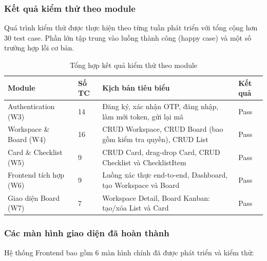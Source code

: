 \subsubsection{Kết quả kiểm thử theo module}

Quá trình kiểm thử được thực hiện theo từng tuần phát triển với tổng cộng hơn 30 test case. Phần lớn tập trung vào luồng thành công (happy case) và một số trường hợp lỗi cơ bản.

\begin{table}[H]
\centering
\begin{tabular}{|p{3.5cm}|p{1.5cm}|p{7cm}|p{1.5cm}|}
\hline
\textbf{Module} & \textbf{Số TC} & \textbf{Kịch bản tiêu biểu} & \textbf{Kết quả} \\
\hline
Authentication (W3) & 14 & Đăng ký, xác nhận OTP, đăng nhập, làm mới token, gửi lại mã & Pass \\
\hline
Workspace \& Board (W4) & 16 & CRUD Workspace, CRUD Board (bao gồm kiểm tra quyền), CRUD List & Pass \\
\hline
Card \& Checklist (W5) & 9 & CRUD Card, drag-drop Card, CRUD Checklist và ChecklistItem & Pass \\
\hline
Frontend tích hợp (W6) & 9 & Luồng xác thực end-to-end, Dashboard, tạo Workspace và Board & Pass \\
\hline
Giao diện Board (W7) & 7 & Workspace Detail, Board Kanban: tạo/xóa List và Card & Pass \\
\hline
\end{tabular}
\caption{Tổng hợp kết quả kiểm thử theo module}
\label{tab:test_summary}
\end{table}

\subsubsection{Các màn hình giao diện đã hoàn thành}

Hệ thống Frontend bao gồm 6 màn hình chính đã được phát triển và kiểm thử:

